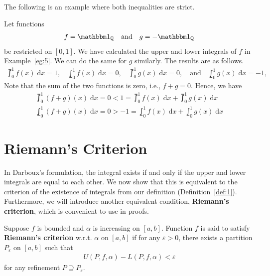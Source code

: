\documentclass[thmcnt=section, 12pt]{my-elegantbook}
\begin{document}
The following is an example where both inequalities are strict.

\begin{example}
    Let functions
    \begin{align*}
        f = \ind_\Q
        \quad \text{and} \quad
        g = -\ind_\Q
    \end{align*}
    be restricted on $[0, 1]$. We have calculated the upper and lower integrals of $f$ in Example~\ref{eg:5}. We can do the same for $g$ similarly. The results are as follows.
    \begin{align*}
        \upint_0^1 f(x) \; \mathrm{d}x = 1,
        \quad
        \lowint_0^1 f(x) \; \mathrm{d}x = 0,
        \quad
        \upint_0^1 g(x) \; \mathrm{d}x = 0,
        \quad \text{and} \quad
        \lowint_0^1 g(x) \; \mathrm{d}x = -1,
    \end{align*}
    Note that the sum of the two functions is zero, i.e., $f + g = 0$. Hence, we have
    \begin{align*}
        \upint_0^1 (f+g)(x) \; \mathrm{d}x
        = 0
        < 1
        = \upint_0^1 f(x) \; \mathrm{d}x + \upint_0^1 g(x) \; \mathrm{d}x \\
        \lowint_0^1 (f+g)(x) \; \mathrm{d}x
        = 0
        > -1
        = \lowint_0^1 f(x) \; \mathrm{d}x + \lowint_0^1 g(x) \; \mathrm{d}x
    \end{align*}
\end{example}


\section{Riemann's Criterion}

In Darboux's formulation, the integral exists if and only if the upper and lower integrals are equal to each other. We now show that this is equivalent to the criterion of the existence of integrals from our definition (Definition~\ref{def:1}). Furthermore, we will introduce another equivalent condition, \textbf{Riemann's criterion}, which is convenient to use in proofs.

\begin{definition}
    Suppose $f$ is bounded and $\alpha$ is increasing on $[a, b]$. Function $f$ is said to satisfy \textbf{Riemann's criterion} w.r.t. $\alpha$ on $[a, b]$ if for any $\varepsilon > 0$, there exists a partition $P_\varepsilon$ on $[a, b]$ such that
    \begin{align*}
        U(P,f,\alpha) - L(P,f,\alpha) < \varepsilon
    \end{align*}
    for any refinement $P \supseteq P_\varepsilon$.
\end{definition}
\end{document}
